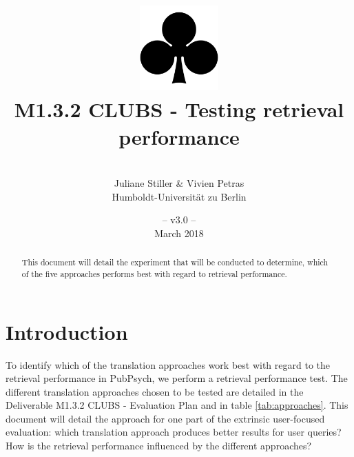 \documentclass[a4paper,11pt]{article}
\title{
\includegraphics[width=3cm]{./img/200px-SuitClubs.png} \\
\Huge M1.3.2 CLUBS - Testing retrieval performance
  \\ 
}
\author{\vspace*{1cm}\\ \LARGE Juliane Stiller \& Vivien Petras \medskip \\ \Large Humboldt-Universit\"at zu Berlin}
\date{\vspace*{2cm} -- v3.0 --\\March 2018}
\begin{document}
\clearpage\maketitle
\thispagestyle{empty}

\vspace*{5cm}
\begin{abstract}
This document will detail the experiment that will be conducted to determine, which of the five approaches performs best with regard to retrieval performance.
\end{abstract}

\newpage
\tableofcontents
\clearpage


\section{Introduction}
To identify which of the translation approaches work best with regard to the retrieval performance in PubPsych, we perform a retrieval performance test. The different translation approaches chosen to be tested are detailed in the Deliverable M1.3.2 CLUBS - Evaluation Plan and in table \ref{tab:approaches}. This document will detail the approach for one part of the extrinsic user-focused evaluation: which translation approach produces better results for user queries? How is the retrieval performance influenced by the different approaches?
\end{document}
